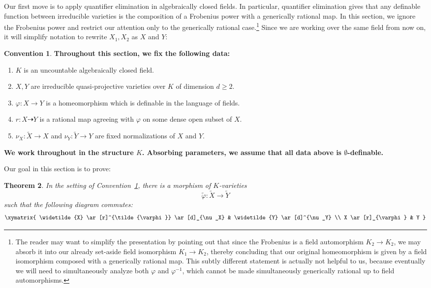 \documentclass{amsart}
\newtheorem{theorem}{Theorem}[section]
\theoremstyle{definition}
\newtheorem{convention}[theorem]{Convention}
\begin{document}
Our first move is to apply quantifier elimination in algebraically closed fields. In particular, quantifier elimination gives that any definable function between irreducible varieties is the composition of a Frobenius power with a generically rational map. In this section, we ignore the Frobenius power and restrict our attention only to the generically rational case.\footnote{The reader may want to simplify the presentation by pointing out that since the Frobenius is a field automorphism $K_2\rightarrow K_2$, we may absorb it into our already set-aside field isomorphism $K_1\rightarrow K_2$, thereby concluding that our original homeomorphism is given by a field isomorphism composed with a generically rational map. This subtly different statement is actually not helpful to us, because eventually we will need to simultaneously analyze both $\varphi$ and $\varphi^{-1}$, which cannot be made  simultaneously generically rational up to field automorphisms.} Since we are working over the same field from now on, it will simplify notation to rewrite $X_1,X_2$ as $X$ and $Y$:

\begin{convention}\label{Con: generically rational setting}
\textbf{Throughout this section, we fix the following data:}
\begin{enumerate}
    \item $K$ is an uncountable algebraically closed field.
    \item $X, Y$ are irreducible quasi-projective varieties over $K$ of dimension $d\geq 2$.
    \item $\varphi : X \to Y$ is a homeomorphism which is definable in the language of fields.
    \item $r:X\dashrightarrow Y$ is a rational map agreeing with $\varphi$ on some dense open subset of $X$.
    \item $\nu_X:\widetilde X\rightarrow X$ and $\nu_Y:\widetilde Y\rightarrow Y$ are fixed normalizations of $X$ and $Y$. 
\end{enumerate}
\textbf{We work throughout in the structure $K$. Absorbing parameters, we assume that all data above is $\emptyset$-definable.}
\end{convention}

Our goal in this section is to prove:

\begin{theorem}\label{T: normalization square}
In the setting of Convention~\ref{Con: generically rational setting}, there is a morphism of $K$-varieties
\[
\tilde{\varphi} : \widetilde{X} \to \widetilde{Y}
\]
such that the following diagram commutes:
\[
\xymatrix{
\widetilde{X} \ar[r]^{\tilde{\varphi}} \ar[d]_{\nu_X} & \widetilde{Y} \ar[d]^{\nu_Y} \\
X \ar[r]_{\varphi} & Y
}
\]
\end{theorem}
\end{document}
